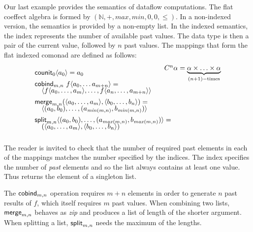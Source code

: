 \begin{example}
\label{thm:semantics-indexed-list}

Our last example provides the semantics of dataflow computations. The flat coeffect algebra
is formed by $(\mathbb{N}, +, \mathit{max}, \mathit{min}, 0, 0, \leq)$. In a
non-indexed version, the semantics is provided by a non-empty list. In the indexed semantics,
the index represents the number of available past values. The data type is then a pair of
the current value, followed by $n$ past values. The mappings that form the flat indexed comonad
are defined as follows:
%
\begin{equation*}
\begin{array}{l}
\ident{counit}_{0}\langle a_0 \rangle = a_0
\\[0.45em]
\ident{cobind}_{m, n}~f \langle a_0, \ldots a_{m+n} \rangle = \\[-0.25em]
\quad \langle f \langle a_0, \ldots, a_m \rangle, \ldots, f \langle a_{n}, \ldots, a_{m+n} \rangle \rangle
\\[0.45em]
\ident{merge}_{m, n} (\langle a_0, \ldots, a_m \rangle, \langle b_0, \ldots, b_n\rangle) = \\[-0.25em]
\quad \langle (a_0, b_0), \ldots, (a_{\mathit{min}(m,n)}, b_{\mathit{min}(m,n)}) \rangle
\\[0.45em]
\ident{split}_{m, n} \langle (a_0, b_0), \ldots, (a_{\mathit{max}(m,n)}, b_{\mathit{max}(m,n)}) \rangle = \\[-0.25em]
\quad (\langle a_0, \ldots, a_m \rangle, \langle b_0, \ldots, b_n\rangle)
\end{array}
\begin{array}{l}
\hspace{-2em}\ctyp{n}{\alpha} = \underbrace{\alpha \times \ldots \times \alpha}_{(n+1)-\textnormal{times}}\\[8em]
~\\
\end{array}
\end{equation*}
\end{example}

\noindent
The reader is invited to check that the number of required past elements in each of the mappings
matches the number specified by the indices. The index specifies the number of \emph{past} elements
and so the list always contains at least one value. Thus  returns the element of a
singleton list.

The $\textnormal{\sffamily cobind}_{m,n}$ operation requires $m + n$ elements in order to generate $n$ past results
of $f$, which itself requires $m$ past values. When combining two lists, $\textnormal{\sffamily merge}_{m,n}$
behaves as \emph{zip} and produces a list of length of the shorter argument. When splitting a list,
$\textnormal{\sffamily split}_{m, n}$ needs the maximum of the lengths.


